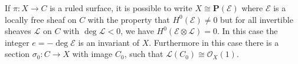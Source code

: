 If $\pi: X \rightarrow C$ is a ruled surface, it is possible to write $X \cong \mathbf{P}(\mathcal{E})$ where $\mathcal{E}$ is a locally free sheaf on $C$ with the property that $H^0(\mathcal{E}) \neq 0$ but for all invertible sheaves $\mathcal{L}$ on $C$ with $\deg \mathcal{L} < 0$, we have $H^0(\mathcal{E} \otimes \mathcal{L}) = 0$. In this case the integer $e = -\deg \mathcal{E}$ is an invariant of $X$. Furthermore in this case there is a section $\sigma_0: C \rightarrow X$ with image $C_0$, such that $\mathcal{L}(C_0) \cong \mathcal{O}_X(1)$.
